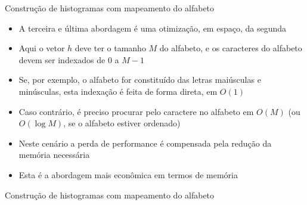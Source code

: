 \begin{frame}[fragile]{Construção de histogramas com mapeamento do alfabeto}

    \begin{itemize}
        \item A terceira e última abordagem é uma otimização, em espaço, da segunda
        \pause

        \item Aqui o vetor $h$ deve ter o tamanho $M$ do alfabeto, e os caracteres do alfabeto 
            devem ser indexados de 0 a $M - 1$
        \pause

        \item Se, por exemplo, o alfabeto for constituído das letras maiúsculas e minúsculas, 
            esta indexação é feita de forma direta, em $O(1)$
        \pause

        \item Caso contrário, é preciso procurar pelo caractere no alfabeto em $O(M)$ (ou 
            $O(\log M)$, se o alfabeto estiver ordenado)
        \pause

        \item Neste cenário a perda de performance é compensada pela redução da memória necessária 
        \pause

        \item Esta é a abordagem mais econômica em termos de memória

    \end{itemize}

\end{frame}

\begin{frame}[fragile]{Construção de histogramas com mapeamento do alfabeto}
\end{frame}
